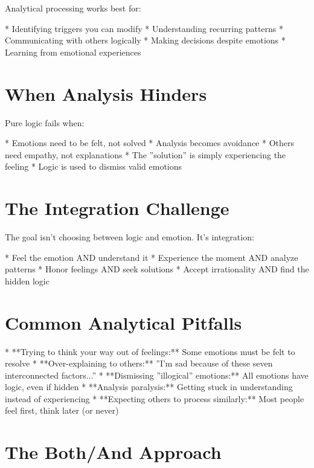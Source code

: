 \documentclass[12pt,oneside]{book}
\begin{document}
Analytical processing works best for:

                    * Identifying triggers you can modify
                    * Understanding recurring patterns
                    * Communicating with others logically
                    * Making decisions despite emotions
                    * Learning from emotional experiences

\section{When Analysis Hinders}

Pure logic fails when:

                    * Emotions need to be felt, not solved
                    * Analysis becomes avoidance
                    * Others need empathy, not explanations
                    * The ''solution'' is simply experiencing the feeling
                    * Logic is used to dismiss valid emotions

\section{The Integration Challenge}

The goal isn't choosing between logic and emotion. It's integration:

                    * Feel the emotion AND understand it
                    * Experience the moment AND analyze patterns
                    * Honor feelings AND seek solutions
                    * Accept irrationality AND find the hidden logic

\section{Common Analytical Pitfalls}

                    * **Trying to think your way out of feelings:** Some emotions must be felt to resolve
                    * **Over-explaining to others:** ''I'm sad because of these seven interconnected factors...''
                    * **Dismissing ''illogical'' emotions:** All emotions have logic, even if hidden
                    * **Analysis paralysis:** Getting stuck in understanding instead of experiencing
                    * **Expecting others to process similarly:** Most people feel first, think later (or never)

\section{The Both/And Approach}
\end{document}
